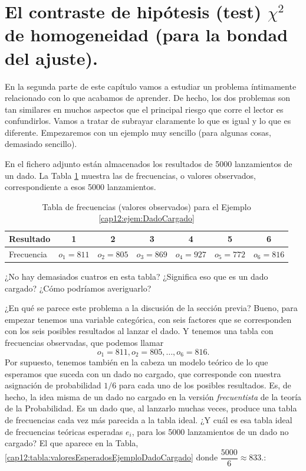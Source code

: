 \section{El contraste de hipótesis (test) $\chi^2$ de homogeneidad (para la bondad del ajuste).}
\label{cap12:sec:ChiCuadradoHomgeneidad}

\noindent En la segunda parte de este capítulo vamos a estudiar un problema íntimamente relacionado con lo que acabamos de aprender. De hecho, los dos problemas son tan similares en muchos aspectos que el principal riesgo que corre el lector es confundirlos. Vamos a tratar de subrayar claramente lo que
es igual y lo que es diferente. Empezaremos con un ejemplo muy sencillo (para algunas cosas, demasiado sencillo).

\begin{ejemplo}
\label{cap12:ejem:DadoCargado}
En el fichero adjunto
 están
almacenados los resultados de 5000 lanzamientos de un dado. La Tabla \ref{cap12:tabla:valoresObservadosEjemploDadoCargado} muestra las de frecuencias, o valores observados,
correspondiente a esos 5000 lanzamientos.

\begin{table}[ht]
    \begin{center}
    \begin{tabular}{|l|c|c|c|c|c|c|}
      \hline
      Resultado & 1 & 2 & 3 & 4 & 5 & 6 \\
      \hline
      Frecuencia & $o_1=811$ & $o_2=805$ & $o_3=869$ & $o_4=927$ & $o_5=772$ & $o_6=816$\\
      \hline
    \end{tabular}
    \end{center}
\caption{Tabla de frecuencias (valores observados) para el Ejemplo \ref{cap12:ejem:DadoCargado}}
\label{cap12:tabla:valoresObservadosEjemploDadoCargado}
\end{table}

¿No hay demasiados cuatros en esta tabla? ¿Significa eso que es un dado cargado? ¿Cómo podríamos averiguarlo?

¿En qué se parece este problema a la discusión de la sección previa? Bueno, para empezar tenemos una variable categórica, con seis factores que se corresponden con los seis posibles resultados al lanzar el dado. Y tenemos una tabla con frecuencias observadas, que podemos llamar
        \[o_1=811, o_2=805,\ldots, o_6=816.\]
Por supuesto, tenemos también en la cabeza un {\sf modelo teórico} de lo que esperamos que suceda con un dado no cargado, que corresponde con  nuestra asignación de probabilidad $1/6$ para cada uno de los posibles resultados. Es, de hecho, la idea misma de un dado no cargado en la versión {\em frecuentista} de la teoría de la Probabilidad. Es un dado que, al lanzarlo muchas veces, produce una tabla de frecuencias cada vez más parecida a la tabla ideal. ¿Y cuál es esa tabla ideal de frecuencias teóricas esperadas $e_i$, para los 5000 lanzamientos de un dado no cargado? El que aparece en la Tabla, \ref{cap12:tabla:valoresEsperadosEjemploDadoCargado} donde $\dfrac{5000}{6}\approx 833$.:


\end{ejemplo}
